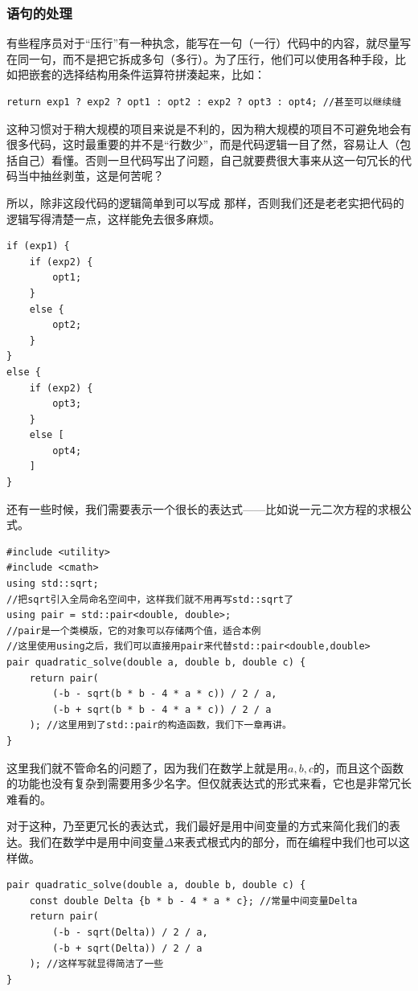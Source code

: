 \subsubsection*{语句的处理}
有些程序员对于``压行''有一种执念，能写在一句（一行）代码中的内容，就尽量写在同一句，而不是把它拆成多句（多行）。为了压行，他们可以使用各种手段，比如把嵌套的选择结构用条件运算符拼湊起来，比如：
\begin{lstlisting}
return exp1 ? exp2 ? opt1 : opt2 : exp2 ? opt3 : opt4; //甚至可以继续缝
\end{lstlisting}\par
这种习惯对于稍大规模的项目来说是不利的，因为稍大规模的项目不可避免地会有很多代码，这时最重要的并不是``行数少''，而是代码逻辑一目了然，容易让人（包括自己）看懂。否则一旦代码写出了问题，自己就要费很大事来从这一句冗长的代码当中抽丝剥茧，这是何苦呢？\par
所以，除非这段代码的逻辑简单到可以写成 \lstinline@max@ 那样，否则我们还是老老实把代码的逻辑写得清楚一点，这样能免去很多麻烦。
\begin{lstlisting}
if (exp1) {
    if (exp2) {
        opt1;
    }
    else {
        opt2;
    }
}
else {
    if (exp2) {
        opt3;
    }
    else [
        opt4;
    ]
}
\end{lstlisting}\par
还有一些时候，我们需要表示一个很长的表达式——比如说一元二次方程的求根公式。
\begin{lstlisting}
#include <utility>
#include <cmath>
using std::sqrt;
//把sqrt引入全局命名空间中，这样我们就不用再写std::sqrt了
using pair = std::pair<double, double>;
//pair是一个类模版，它的对象可以存储两个值，适合本例
//这里使用using之后，我们可以直接用pair来代替std::pair<double,double>
pair quadratic_solve(double a, double b, double c) {
    return pair(
        (-b - sqrt(b * b - 4 * a * c)) / 2 / a,
        (-b + sqrt(b * b - 4 * a * c)) / 2 / a
    ); //这里用到了std::pair的构造函数，我们下一章再讲。
}
\end{lstlisting}
这里我们就不管命名的问题了，因为我们在数学上就是用$a,b,c$的，而且这个函数的功能也没有复杂到需要用多少名字。但仅就表达式的形式来看，它也是非常冗长难看的。\par
对于这种，乃至更冗长的表达式，我们最好是用中间变量的方式来简化我们的表达。我们在数学中是用中间变量$\Delta$来表式根式内的部分，而在编程中我们也可以这样做。
\begin{lstlisting}
pair quadratic_solve(double a, double b, double c) {
    const double Delta {b * b - 4 * a * c}; //常量中间变量Delta
    return pair(
        (-b - sqrt(Delta)) / 2 / a,
        (-b + sqrt(Delta)) / 2 / a
    ); //这样写就显得简洁了一些
}
\end{lstlisting}\par

